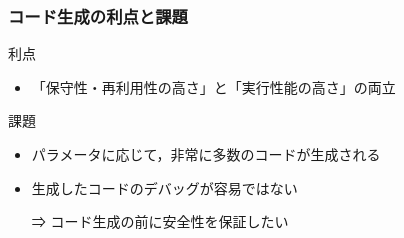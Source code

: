 \begin{frame}
  \frametitle{コード生成の利点と課題}
  利点
  \begin{itemize}
  \item \alert{「保守性・再利用性の高さ」}と\alert{「実行性能の高さ」}の両立
  \end{itemize}

  \pause

  課題
  \begin{itemize}
  \item パラメータに応じて，非常に多数のコードが生成される
  \item 生成したコードのデバッグが容易ではない
  \item [⇒] \alert{コード生成の前に安全性を保証}したい
  \end{itemize}
\end{frame}


